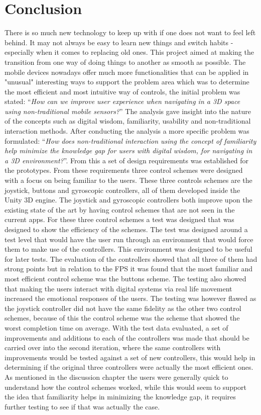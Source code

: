 \chapter{Conclusion}
There is so much new technology to keep up with if one does not want to feel left behind. It may not always be easy to learn new things and switch habits - especially when it comes to replacing old ones. This project aimed at making the transition from one way of doing things to another as smooth as possible. The mobile devices nowadays offer much more functionalities that can be applied in "unusual" interesting ways to support the problem area which was to determine the most efficient and most intuitive way of controls, the initial problem was stated: “\textit{How can we improve user experience when navigating in a 3D space using non-traditional mobile sensors?}”
The analysis gave insight into the nature of the concepts such as digital wisdom, familiarity, usability and non-traditional interaction methods. After conducting the analysis  a  more specific problem was formulated: “\textit{How does non-traditional interaction using the concept of familiarity help minimize the knowledge gap for users with digital wisdom, for navigating in a 3D environment?}”. From this a set of design requirements was established for the prototypes. From these requirements three control schemes were designed with a focus on being familiar to the users. These three controls schemes are the joystick, buttons and gyroscopic controllers, all of them developed inside the Unity 3D engine. The joystick and gyroscopic controllers both improve upon the existing state of the art by having control schemes that are not seen in the current apps.
For these three control schemes a test was designed that was designed to show the efficiency of the schemes. The test was designed around a test level that would have the user run through an environment that would force them to make use of the controllers. This environment was designed to be useful for later tests. The evaluation of the controllers showed that all three of them had strong points but in relation to the FPS it was found that the most familiar and most efficient control scheme was the buttons scheme. The testing also showed that making the users interact with digital systems via real life movement increased the emotional responses of the users. The testing was however flawed as the joystick controller did not have the same fidelity as the other two control schemes, because of this the control scheme was the scheme that showed the worst completion time on average. With the test data evaluated, a set of improvements and additions to each of the controllers was made that should be carried over into the second iteration, where the same controllers with improvements would be tested against a set of new controllers, this would help in determining if the original three controllers were actually the most efficient ones. As mentioned in the discussion chapter the users were generally quick to understand how the control schemes worked, while this would seem to support the idea that familiarity helps in minimizing the knowledge gap, it requires further testing to see if that was actually the case.